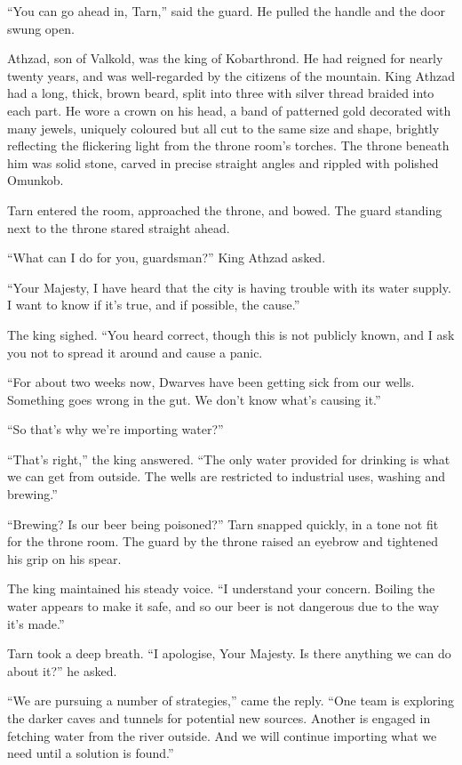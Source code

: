 ``You can go ahead in, Tarn,'' said the guard.  He pulled the handle and the door swung open.

Athzad, son of Valkold, was the king of Kobarthrond.  He had reigned for nearly twenty years, and was well-regarded by the citizens of the mountain.  King Athzad had a long, thick, brown beard, split into three with silver thread braided into each part.  He wore a crown on his head, a band of patterned gold decorated with many jewels, uniquely coloured but all cut to the same size and shape, brightly reflecting the flickering light from the throne room's torches.  The throne beneath him was solid stone, carved in precise straight angles and rippled with polished Omunkob.

Tarn entered the room, approached the throne, and bowed.  The guard standing next to the throne stared straight ahead.

``What can I do for you, guardsman?'' King Athzad asked.

``Your Majesty, I have heard that the city is having trouble with its water supply.  I want to know if it's true, and if possible, the cause.''

The king sighed.  ``You heard correct, though this is not publicly known, and I ask you not to spread it around and cause a panic.

``For about two weeks now, Dwarves have been getting sick from our wells.  Something goes wrong in the gut.  We don't know what's causing it.''

``So that's why we're importing water?''

``That's right,'' the king answered.  ``The only water provided for drinking is what we can get from outside.  The wells are restricted to industrial uses, washing and brewing.''

``Brewing?  Is our beer being poisoned?'' Tarn snapped quickly, in a tone not fit for the throne room.  The guard by the throne raised an eyebrow and tightened his grip on his spear.

The king maintained his steady voice.  ``I understand your concern.  Boiling the water appears to make it safe, and so our beer is not dangerous due to the way it's made.''

Tarn took a deep breath.  ``I apologise, Your Majesty.  Is there anything we can do about it?'' he asked.

``We are pursuing a number of strategies,'' came the reply.  ``One team is exploring the darker caves and tunnels for potential new sources.  Another is engaged in fetching water from the river outside.  And we will continue importing what we need until a solution is found.''


